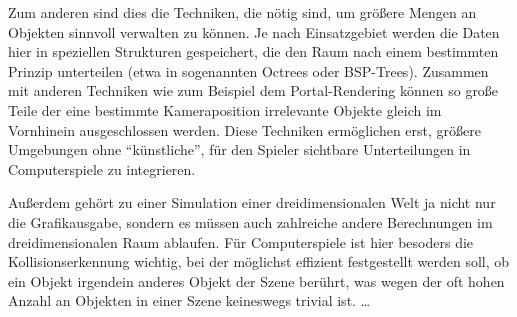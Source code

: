 Zum anderen sind dies die Techniken, die nötig sind, um größere Mengen an Objekten sinnvoll verwalten zu können. Je nach Einsatzgebiet werden die Daten hier in speziellen Strukturen gespeichert, die den Raum nach einem bestimmten Prinzip unterteilen (etwa in sogenannten Octrees oder BSP-Trees). Zusammen mit anderen Techniken wie zum Beispiel dem Portal-Rendering können so große Teile der eine bestimmte Kameraposition irrelevante Objekte gleich im Vornhinein ausgeschlossen werden. Diese Techniken ermöglichen erst, größere Umgebungen ohne \enquote{künstliche}, für den Spieler sichtbare Unterteilungen in Computerspiele zu integrieren.

Außerdem gehört zu einer Simulation einer dreidimensionalen Welt ja nicht nur die Grafikausgabe, sondern es müssen auch zahlreiche andere Berechnungen im dreidimensionalen Raum ablaufen. Für Computerspiele ist hier besoders die Kollisionserkennung wichtig, bei der möglichst effizient festgestellt werden soll, ob ein Objekt irgendein anderes Objekt der Szene berührt, was wegen der oft hohen Anzahl an Objekten in einer Szene keineswegs trivial ist. \ldots
